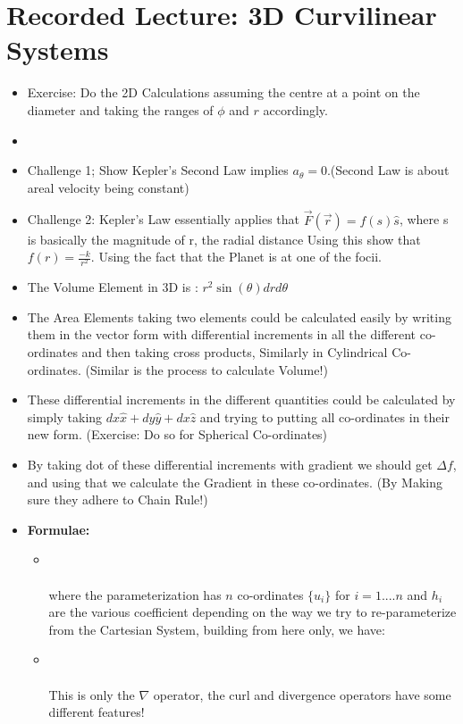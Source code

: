 \documentclass{article}
\begin{document}
\section{Recorded Lecture: 3D Curvilinear Systems}
\begin{itemize}
  \item  Exercise: Do the 2D Calculations assuming the centre at a point on the diameter and taking the ranges of $\phi$ and $r$ accordingly.
  \item {}
  \item Challenge 1; Show Kepler's Second Law implies $a_{\theta} = 0$.(Second Law is about areal velocity being constant)
  \item Challenge 2: Kepler's Law essentially applies that $\vec{F}(\vec{r}) = f(s)\hat{s}$, where s is basically the magnitude of r, the radial distance
  Using this show that $f(r) = \frac{-k}{r^{2}}$. Using the fact that the Planet is at one of the focii.
  \item The Volume Element in 3D is : $r^{2}\sin(\theta)drd\theta$
  \item The Area Elements taking two elements could be calculated easily by writing them in the vector form with differential increments in all the different co-ordinates and then taking cross products, Similarly in Cylindrical Co-ordinates. (Similar is the process to calculate Volume!)

  \item These differential increments in the different quantities could be calculated by simply taking $dx\hat{x} + dy\hat{y} + dx\hat{z}$ and trying to putting all co-ordinates in their new form. (Exercise: Do so for Spherical Co-ordinates)

  \item By taking dot of these differential increments with gradient we should get $\Delta f$, and using that we calculate the Gradient in these co-ordinates. (By Making sure they adhere to Chain Rule!)


  \item \textbf{Formulae:}

  \begin{itemize}
    \item {} \\ \\
    where the parameterization has $n$ co-ordinates $\{u_i\}$ for $i = 1....n$ and $h_i$ are the various coefficient depending on the way we try to re-parameterize from the Cartesian System, building from here only, we have:
    \item {}  \\
    \\
    This is only the $\nabla$ operator, the curl and divergence operators have some different features!
  \end{itemize}

\end{itemize}
\end{document}
